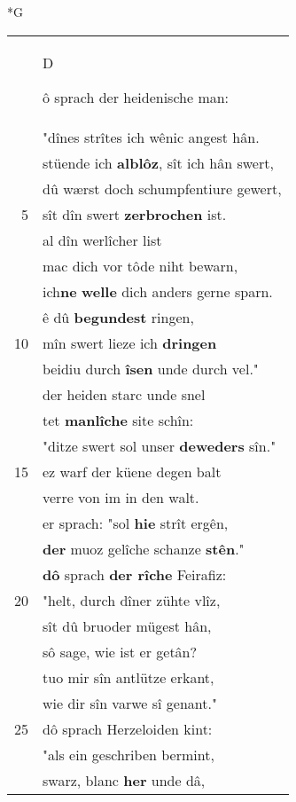 \documentclass[8pt,a4paper,notitlepage]{article}
\begin{document}
\newpage
\begin{table}[ht]
\begin{minipage}[t]{0.5\linewidth}
\small
\begin{center}*G
\end{center}
\begin{tabular}{rl}
 & \begin{large}D\end{large}ô sprach der heidenische man:\\ 
 & "dînes strîtes ich wênic angest hân.\\ 
 & stüende ich \textbf{alblôz}, sît ich hân swert,\\ 
 & dû wærst doch schumpfentiure gewert,\\ 
5 & sît dîn swert \textbf{zerbrochen} ist.\\ 
 & al dîn werlîcher list\\ 
 & mac dich vor tôde niht bewarn,\\ 
 & ich\textbf{ne} \textbf{welle} dich anders gerne sparn.\\ 
 & ê dû \textbf{begundest} ringen,\\ 
10 & mîn swert lieze ich \textbf{dringen}\\ 
 & beidiu durch \textbf{îsen} unde durch vel."\\ 
 & der heiden starc unde snel\\ 
 & tet \textbf{manlîche} site schîn:\\ 
 & "ditze swert sol unser \textbf{deweders} sîn."\\ 
15 & ez warf der küene degen balt\\ 
 & verre von im in den walt.\\ 
 & er sprach: "sol \textbf{hie} strît ergên,\\ 
 & \textbf{der} muoz gelîche schanze \textbf{stên}."\\ 
 & \textbf{dô} sprach \textbf{der rîche} Feirafiz:\\ 
20 & "helt, durch dîner zühte vlîz,\\ 
 & sît dû bruoder mügest hân,\\ 
 & sô sage, wie ist er getân?\\ 
 & tuo mir sîn antlütze erkant,\\ 
 & wie dir sîn varwe sî genant."\\ 
25 & dô sprach Herzeloiden kint:\\ 
 & "als ein geschriben bermint,\\ 
 & swarz, blanc \textbf{her} unde dâ,\\ 

\end{tabular}
\end{minipage}
\end{table}
\end{document}
